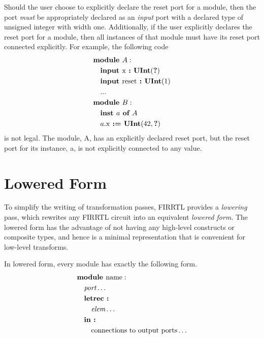 \documentclass[12pt]{article}
\begin{document}
Should the user choose to explicitly declare the reset port for a module, then the port {\em must} be appropriately declared as an {\em input} port with a declared type of unsigned integer with width one. Additionally, if the user explicitly declares the reset port for a module, then all instances of that module must have its reset port connected explicitly. For example, the following code
\[
\begin{aligned}
&\kw{module} A :                               \\
&\quad \kw{input} \text{x} \kw{ :} \kws{UInt}(\kws{?})\\
&\quad \kw{input} \text{reset} \kw{ :} \kws{UInt}(1)\\
&\quad   ...                                   \\
&\kw{module} B :                               \\
&\quad \kw{inst} a \kw{ of} A                  \\
&\quad a.\text{x} \kw{ :=} \kws{UInt}(42, \kws{?})    \\
\end{aligned}
\]
is not legal. The module, A, has an explicitly declared reset port, but the reset port for its instance, a, is not explicitly connected to any value.

\section{Lowered Form}

To simplify the writing of transformation passes, FIRRTL provides a {\em lowering} pass, which rewrites any FIRRTL circuit into an equivalent {\em lowered form}. The lowered form has the advantage of not having any high-level constructs or composite types, and hence is a minimal representation that is convenient for low-level transforms. 

In lowered form, every module has exactly the following form.
\[
\begin{aligned}
&\text{\bf module\ } \text{name} :                                 \\
&\quad \text{\em port} \ldots                                   \\
&\quad \text{\bf letrec :\ }                                       \\
&\quad \quad \text{\em elem} \ldots                             \\
&\quad \text{\bf in :\ }                                           \\
&\quad \quad \text{connections to output ports} \ldots     \\
\end{aligned}
\]
\end{document}
